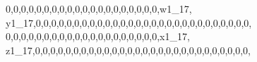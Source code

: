 \documentclass[]{article}
\newenvironment{Shaded}{\begin{snugshade}}{\end{snugshade}}
\newcommand{\DecValTok}[1]{\textcolor[rgb]{0.00,0.00,0.81}{#1}}
\newcommand{\NormalTok}[1]{#1}
\begin{document}
\begin{Shaded}
\begin{Highlighting}[]
\DecValTok{0}\NormalTok{,}\DecValTok{0}\NormalTok{,}\DecValTok{0}\NormalTok{,}\DecValTok{0}\NormalTok{,}\DecValTok{0}\NormalTok{,}\DecValTok{0}\NormalTok{,}\DecValTok{0}\NormalTok{,}\DecValTok{0}\NormalTok{,}\DecValTok{0}\NormalTok{,}\DecValTok{0}\NormalTok{,}\DecValTok{0}\NormalTok{,}\DecValTok{0}\NormalTok{,}\DecValTok{0}\NormalTok{,}\DecValTok{0}\NormalTok{,}\DecValTok{0}\NormalTok{,}\DecValTok{0}\NormalTok{,}\DecValTok{0}\NormalTok{,}\DecValTok{0}\NormalTok{,}\DecValTok{0}\NormalTok{,}\DecValTok{0}\NormalTok{,w1_}\DecValTok{17}\NormalTok{, y1_}\DecValTok{17}\NormalTok{,}\DecValTok{0}\NormalTok{,}\DecValTok{0}\NormalTok{,}\DecValTok{0}\NormalTok{,}\DecValTok{0}\NormalTok{,}\DecValTok{0}\NormalTok{,}\DecValTok{0}\NormalTok{,}\DecValTok{0}\NormalTok{,}\DecValTok{0}\NormalTok{,}\DecValTok{0}\NormalTok{,}\DecValTok{0}\NormalTok{,}\DecValTok{0}\NormalTok{,}\DecValTok{0}\NormalTok{,}\DecValTok{0}\NormalTok{,}\DecValTok{0}\NormalTok{,}\DecValTok{0}\NormalTok{,}\DecValTok{0}\NormalTok{,}\DecValTok{0}\NormalTok{,}\DecValTok{0}\NormalTok{,}\DecValTok{0}\NormalTok{,}\DecValTok{0}\NormalTok{,}\DecValTok{0}\NormalTok{,}\DecValTok{0}\NormalTok{,}\DecValTok{0}\NormalTok{,}\DecValTok{0}\NormalTok{,}\DecValTok{0}\NormalTok{,}\DecValTok{0}\NormalTok{,}\DecValTok{0}\NormalTok{,}\DecValTok{0}\NormalTok{,}
\DecValTok{0}\NormalTok{,}\DecValTok{0}\NormalTok{,}\DecValTok{0}\NormalTok{,}\DecValTok{0}\NormalTok{,}\DecValTok{0}\NormalTok{,}\DecValTok{0}\NormalTok{,}\DecValTok{0}\NormalTok{,}\DecValTok{0}\NormalTok{,}\DecValTok{0}\NormalTok{,}\DecValTok{0}\NormalTok{,}\DecValTok{0}\NormalTok{,}\DecValTok{0}\NormalTok{,}\DecValTok{0}\NormalTok{,}\DecValTok{0}\NormalTok{,}\DecValTok{0}\NormalTok{,}\DecValTok{0}\NormalTok{,}\DecValTok{0}\NormalTok{,}\DecValTok{0}\NormalTok{,}\DecValTok{0}\NormalTok{,}\DecValTok{0}\NormalTok{,x1_}\DecValTok{17}\NormalTok{, z1_}\DecValTok{17}\NormalTok{,}\DecValTok{0}\NormalTok{,}\DecValTok{0}\NormalTok{,}\DecValTok{0}\NormalTok{,}\DecValTok{0}\NormalTok{,}\DecValTok{0}\NormalTok{,}\DecValTok{0}\NormalTok{,}\DecValTok{0}\NormalTok{,}\DecValTok{0}\NormalTok{,}\DecValTok{0}\NormalTok{,}\DecValTok{0}\NormalTok{,}\DecValTok{0}\NormalTok{,}\DecValTok{0}\NormalTok{,}\DecValTok{0}\NormalTok{,}\DecValTok{0}\NormalTok{,}\DecValTok{0}\NormalTok{,}\DecValTok{0}\NormalTok{,}\DecValTok{0}\NormalTok{,}\DecValTok{0}\NormalTok{,}\DecValTok{0}\NormalTok{,}\DecValTok{0}\NormalTok{,}\DecValTok{0}\NormalTok{,}\DecValTok{0}\NormalTok{,}\DecValTok{0}\NormalTok{,}\DecValTok{0}\NormalTok{,}\DecValTok{0}\NormalTok{,}\DecValTok{0}\NormalTok{,}\DecValTok{0}\NormalTok{,}\DecValTok{0}\NormalTok{,}

\end{Highlighting}
\end{Shaded}
\end{document}
